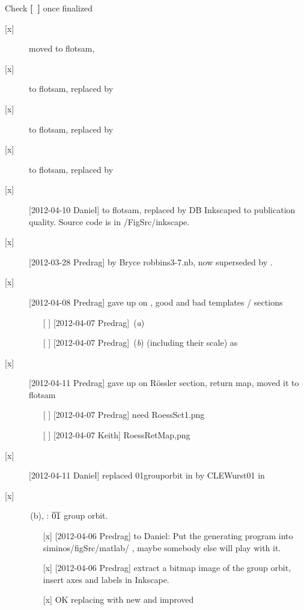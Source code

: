 Check {\bf [~]} once finalized
\begin{description}

\item[{[x]}] moved  to flotsam,
\item[{[x]}]  to flotsam, replaced by 
\item[{[x]}]  to flotsam, replaced by 
\item[{[x]}]  to flotsam, replaced by 
\item[{[x]}] [2012-04-10 Daniel]   to flotsam, replaced by
             DB Inkscaped  to
             publication quality. Source code is in /FigSrc/inkscape.

\item[{[x]}] [2012-03-28 Predrag]
         by Bryce robbins3-7.nb, now superseded by
        .

\item[{[x]}] [2012-04-08 Predrag] gave up on ,
    good and bad templates / sections
    \begin{itemize}
        \item[{[ ]}] [2012-04-07 Predrag] \,({\it a})
        \item[{[ ]}] [2012-04-07 Predrag] \,({\it b})
            (including their scale) as
    \end{itemize}

\item[{[x]}] [2012-04-11 Predrag]  gave up on 
    R\"ossler section, return map, moved it to flotsam
    \begin{itemize}
        \item[{[ ]}] [2012-04-07 Predrag] need {RoessSct1}.png
        \item[{[ ]}] [2012-04-07 Keith] {RoessRetMap},png
    \end{itemize}

\item[{[x]}] [2012-04-11 Daniel]  replaced {01grouporbit} in
    by CLEWurst01 in 

\item[{[x]}] \,(b), \CLf: $\overline{01}$ {\rpo} group orbit.
    \begin{itemize}
        \item[{[x]}]  [2012-04-06 Predrag] to Daniel:
            Put the generating program into siminos/figSrc/matlab/ , maybe
            somebody else will play with it.
        \item[{[x]}]  [2012-04-06 Predrag] extract a bitmap image of the
            group orbit, insert axes and labels in Inkscape.
        \item[{[x]}] OK replacing  with new and
            improved 
		\end{itemize}

\end{description}
\newpage

